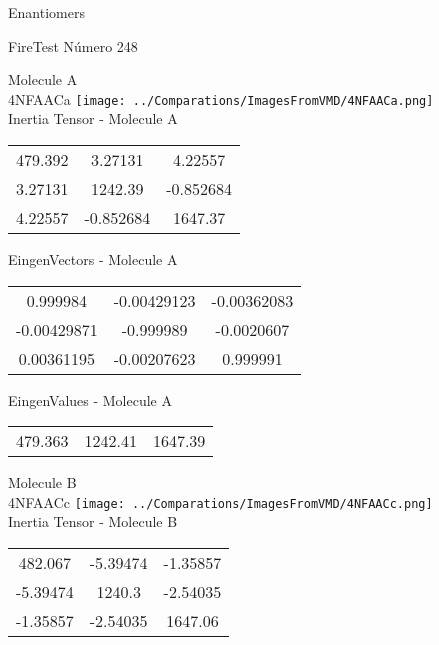 \begin{center}
\vtab
\vtab
\textcolor{NavyBlue}{\Large Enantiomers}
\end{center}

 \newpage

\vtab[-2cm]
\begin{center}
{\large FireTest \tab Número 248}
\end{center}
\begin{multicols}{2}
\begin{center}

Molecule A \\ 
4NFAACa
\texttt{[image: ../Comparations/ImagesFromVMD/4NFAACa.png]}
\\
Inertia Tensor - Molecule A \\
\vtab

\begin{tabular}{|c c c|}
479.392	 & 	3.27131	 & 	4.22557	 \\
3.27131	 & 	1242.39	 & 	-0.852684	 \\
4.22557	 & 	-0.852684	 & 	1647.37
\end{tabular}

\vtab
 EingenVectors - Molecule A     \\
\vtab
\begin{tabular}{|c c c|}
0.999984	 & 	-0.00429123	 & 	-0.00362083	 \\
-0.00429871	 & 	-0.999989	 & 	-0.0020607	 \\
0.00361195	 & 	-0.00207623	 & 	0.999991
\end{tabular}

\vtab
 EingenValues - Molecule A     \\
\vtab
\begin{tabular}{|c c c|}
479.363	 & 	1242.41	 & 	1647.39	 \\
\end{tabular}
\columnbreak

Molecule B \\ 
4NFAACc
\texttt{[image: ../Comparations/ImagesFromVMD/4NFAACc.png]}
\\
Inertia Tensor - Molecule B \\
\vtab

\begin{tabular}{|c c c|}
482.067	 & 	-5.39474	 & 	-1.35857	 \\
-5.39474	 & 	1240.3	 & 	-2.54035	 \\
-1.35857	 & 	-2.54035	 & 	1647.06
\end{tabular}


\end{center}
\end{multicols}
